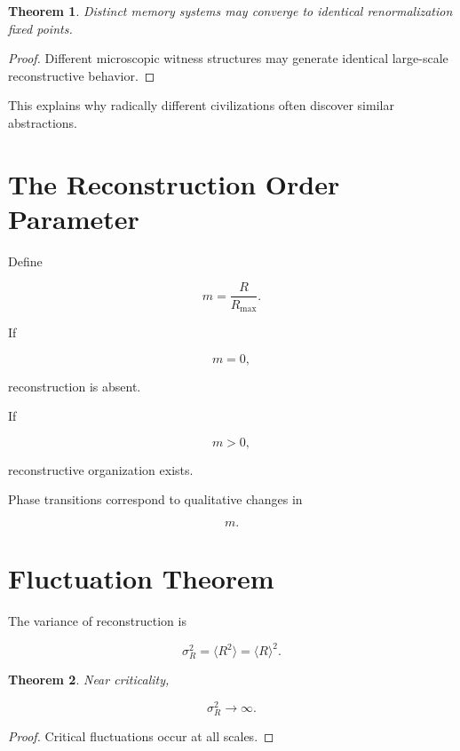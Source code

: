 \documentclass[12pt,oneside]{book}
\theoremstyle{plain} \newtheorem{theorem}{Theorem}[chapter] \newtheorem{lemma}[theorem]{Lemma} \newtheorem{proposition}[theorem]{Proposition} \newtheorem{corollary}[theorem]{Corollary}
\theoremstyle{definition} \newtheorem{definition}[theorem]{Definition} \newtheorem{axiom}[theorem]{Axiom} \newtheorem{construction}[theorem]{Construction}
\theoremstyle{remark} \newtheorem{remark}[theorem]{Remark} \newtheorem{example}[theorem]{Example}
\begin{document}
\begin{theorem}

Distinct memory systems may converge to identical renormalization fixed points.

\end{theorem}

\begin{proof}

Different microscopic witness structures may generate identical large-scale reconstructive behavior.

\end{proof}

This explains why radically different civilizations often discover similar abstractions.

\section{The Reconstruction Order Parameter}

Define

\[
m
=
\frac{R}{R_{\max}}.
\]

If

\[
m=0,
\]

reconstruction is absent.

If

\[
m>0,
\]

reconstructive organization exists.

Phase transitions correspond to qualitative changes in

\[
m.
\]

\section{Fluctuation Theorem}

The variance of reconstruction is

\[
\sigma_R^2
=
\langle R^2\rangle
=
\langle R\rangle^2.
\]

\begin{theorem}

Near criticality,

\[
\sigma_R^2
\rightarrow
\infty.
\]

\end{theorem}

\begin{proof}

Critical fluctuations occur at all scales.

\end{proof}
\end{document}
